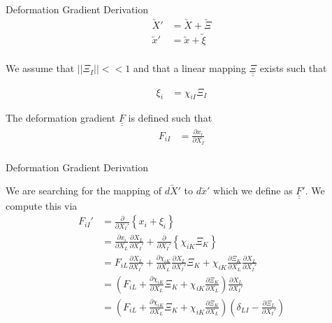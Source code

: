 \documentclass[11pt]{beamer}
\newcommand{\TEN}[1]{\underline{\underline{#1}}}
\newcommand{\VEC}[1]{\utilde{#1}}
\newcommand{\LTN}[1]{\left|\left| #1 \right|\right|}
\begin{document}
\begin{frame}{Deformation Gradient Derivation}
\begin{align*}
\VEC{X}' &= \VEC{X}+\VEC{\Xi}\\
\VEC{x}' &= \VEC{x}+\VEC{\xi}\\
\end{align*}

We assume that $\LTN{\Xi_{I}} << 1$ and that a linear mapping $\TEN{\Xi}$ exists such that

\begin{align*}
\xi_i &= \chi_{iI} \Xi_I
\end{align*}

The deformation gradient $\TEN{F}$ is defined such that
\begin{align*}
F_{iI} &= \frac{\partial x_i}{\partial X_I}\\
\end{align*}
\end{frame}

\begin{frame}{Deformation Gradient Derivation}

We are searching for the mapping of $d\VEC{X}'$ to $d\VEC{x}'$ which we define as $\TEN{F}'$. We compute this via
\begin{align*}
F_{iI}' &= \frac{\partial}{\partial X_I'} \left\{x_i + \xi_i\right\}\\
&= \frac{\partial x_i}{\partial X_L}\frac{\partial X_L}{\partial X_I'} + \frac{\partial}{\partial X_I'} \left\{\chi_{iK}\Xi_{K}\right\}\\
&= F_{iL} \frac{\partial X_L}{\partial X_I'} + \frac{\partial \chi_{iK}}{\partial X_L}\frac{\partial X_L}{\partial X_I'}\Xi_{K} + \chi_{iK} \frac{\partial \Xi_K}{\partial X_L}\frac{\partial X_L}{\partial X_I'}\\
&= \left(F_{iL} + \frac{\partial \chi_{iK}}{\partial X_L}\Xi_{K} + \chi_{iK} \frac{\partial \Xi_K}{\partial X_L}\right)\frac{\partial X_L}{\partial X_I'}\\
&= \left(F_{iL} + \frac{\partial \chi_{iK}}{\partial X_L}\Xi_{K} + \chi_{iK} \frac{\partial \Xi_K}{\partial X_L}\right)\left(\delta_{LI} - \frac{\partial \Xi_L}{\partial X_I'}\right)\\
\end{align*}

\end{frame}
\end{document}
